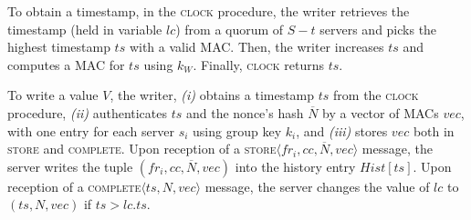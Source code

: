 \documentclass[10pt,conference,compsocconf]{IEEEtran}
\newcommand{\complete}{\textsc{complete}}
\newcommand{\nonce}{N}
\newcommand{\hash}{\overline{N}}
\begin{document}
To obtain a timestamp, in the \textsc{clock} procedure, the writer retrieves the timestamp (held in variable $lc$) from a quorum of $S-t$ servers and picks the highest timestamp $ts$ with a valid MAC. Then, the writer increases $ts$ and computes a MAC for $ts$ using $k_W$. Finally, \textsc{clock} returns $ts$.

To write a value $V$, the writer, \emph{(i)} obtains a timestamp $ts$ from the \textsc{clock} procedure, \emph{(ii)} authenticates $ts$ and the nonce's hash $\hash$ by a vector of MACs $vec$, with one entry for each server $s_i$ using group key $k_i$, and \emph{(iii)} stores $vec$ both in \textsc{store} and \complete. Upon reception of a \textsc{store}$\langle fr_i, cc, \hash, vec \rangle$ message, the server writes the tuple $(fr_i, cc, \hash, vec)$ into the history entry $Hist[ts]$. Upon reception of a \complete$\langle ts, \nonce, vec \rangle$ message, the server changes the value of $lc$ to $(ts, \nonce, vec)$ if $ts > lc.ts$.
\end{document}
